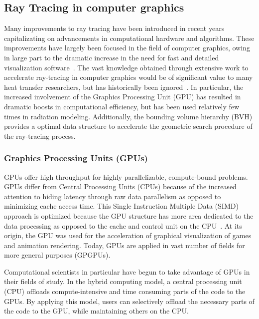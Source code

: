\subsection{Ray Tracing in computer graphics}
Many improvements to ray tracing have been introduced in recent years capitalizating on advancements in computational hardware and algorithms.
These improvements have largely been focused in the field of computer graphics, owing in large part to the dramatic increase in the need for fast and detailed visualization software~\cite{Gupta2020CUDAComputing}. 
The vast knowledge obtained through extensive work to accelerate ray-tracing in computer graphics would be of significant value to many heat transfer researchers, but has historically been ignored~\cite{Howell2021TheTransfer}. 
In particular, the increased involvement of the Graphics Processing Unit (GPU) has resulted in dramatic boosts in computational efficiency, but has been used relatively few times in radiation modeling.
Additionally, the bounding volume hierarchy (BVH) provides a optimal data structure to accelerate the geometric search procedure of the ray-tracing process.

\subsubsection{Graphics Processing Units (GPUs)}
GPUs offer high throughput for highly parallelizable, compute-bound problems.
GPUs differ from Central Processing Units (CPUs) because of the increased attention to hiding latency through raw data parallelism as opposed to minimizing cache access time. 
This Single Instruction Multiple Data (SIMD) approach is optimized because the GPU structure has more area dedicated to the data processing as opposed to the cache and control unit on the CPU~\cite{Gupta2020CUDAComputing}.
At its origin, the GPU was used for the acceleration of graphical visualization of games and animation rendering. Today, GPUs are applied in vast number of fields for more general purposes (GPGPUs).

Computational scientists in particular have begun to take advantage of GPUs in their fields of study. In the hybrid computing model, a central processing unit (CPU) offloads compute-intensive and time consuming parts of the code to the GPUs.
By applying this model, users can selectively offload the necessary parts of the code to the GPU, while maintaining others on the CPU.

